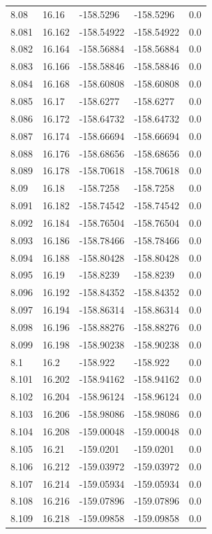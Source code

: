 \begin{tabular}{lllll}
8.08 & 16.16 & -158.5296 & -158.5296 & 0.0 \\
8.081 & 16.162 & -158.54922 & -158.54922 & 0.0 \\
8.082 & 16.164 & -158.56884 & -158.56884 & 0.0 \\
8.083 & 16.166 & -158.58846 & -158.58846 & 0.0 \\
8.084 & 16.168 & -158.60808 & -158.60808 & 0.0 \\
8.085 & 16.17 & -158.6277 & -158.6277 & 0.0 \\
8.086 & 16.172 & -158.64732 & -158.64732 & 0.0 \\
8.087 & 16.174 & -158.66694 & -158.66694 & 0.0 \\
8.088 & 16.176 & -158.68656 & -158.68656 & 0.0 \\
8.089 & 16.178 & -158.70618 & -158.70618 & 0.0 \\
8.09 & 16.18 & -158.7258 & -158.7258 & 0.0 \\
8.091 & 16.182 & -158.74542 & -158.74542 & 0.0 \\
8.092 & 16.184 & -158.76504 & -158.76504 & 0.0 \\
8.093 & 16.186 & -158.78466 & -158.78466 & 0.0 \\
8.094 & 16.188 & -158.80428 & -158.80428 & 0.0 \\
8.095 & 16.19 & -158.8239 & -158.8239 & 0.0 \\
8.096 & 16.192 & -158.84352 & -158.84352 & 0.0 \\
8.097 & 16.194 & -158.86314 & -158.86314 & 0.0 \\
8.098 & 16.196 & -158.88276 & -158.88276 & 0.0 \\
8.099 & 16.198 & -158.90238 & -158.90238 & 0.0 \\
8.1 & 16.2 & -158.922 & -158.922 & 0.0 \\
8.101 & 16.202 & -158.94162 & -158.94162 & 0.0 \\
8.102 & 16.204 & -158.96124 & -158.96124 & 0.0 \\
8.103 & 16.206 & -158.98086 & -158.98086 & 0.0 \\
8.104 & 16.208 & -159.00048 & -159.00048 & 0.0 \\
8.105 & 16.21 & -159.0201 & -159.0201 & 0.0 \\
8.106 & 16.212 & -159.03972 & -159.03972 & 0.0 \\
8.107 & 16.214 & -159.05934 & -159.05934 & 0.0 \\
8.108 & 16.216 & -159.07896 & -159.07896 & 0.0 \\
8.109 & 16.218 & -159.09858 & -159.09858 & 0.0 \\

\end{tabular}
